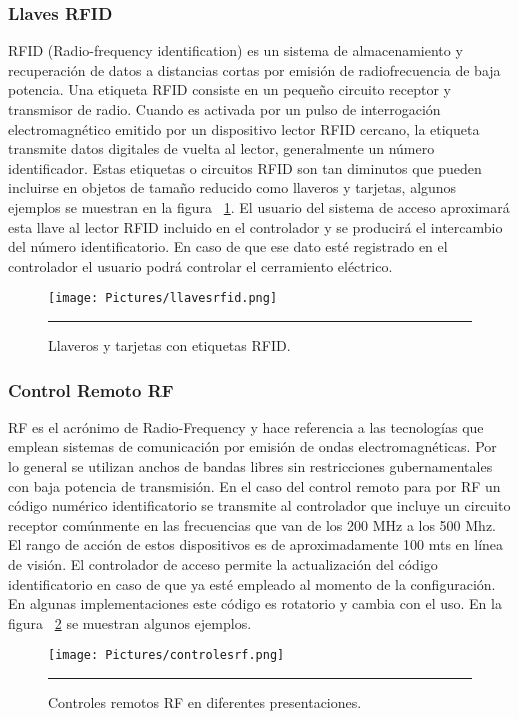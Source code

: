\subsubsection{Llaves RFID}
RFID (Radio-frequency identification) es un sistema de almacenamiento y recuperación de datos a distancias cortas por emisión de radiofrecuencia de baja potencia. 
Una etiqueta RFID consiste en un pequeño circuito receptor y transmisor de radio. Cuando es activada por un pulso de interrogación electromagnético emitido por un dispositivo lector RFID cercano, la etiqueta transmite datos digitales de vuelta al lector, generalmente un número identificador.
Estas etiquetas o circuitos RFID son tan diminutos que pueden incluirse en objetos de tamaño reducido como llaveros y tarjetas, algunos ejemplos se muestran en la figura ~\ref{fig:llavesrfid}.
El usuario del sistema de acceso aproximará esta llave al lector RFID incluido en el controlador y se producirá el intercambio del número identificatorio. En caso de que ese dato esté registrado en el controlador el usuario podrá controlar el cerramiento eléctrico.

\begin{figure}[htbp]
	\centering
	\texttt{[image: Pictures/llavesrfid.png]}
	\rule{35em}{1pt}
	\caption[Llaves RFID]{Llaveros y tarjetas con etiquetas RFID. }
	\label{fig:llavesrfid}
\end{figure}

\subsubsection{Control Remoto RF}
RF es el acrónimo de Radio-Frequency y hace referencia a las tecnologías que emplean sistemas de comunicación por emisión de ondas electromagnéticas. Por lo general se utilizan anchos de bandas libres sin restricciones gubernamentales con baja potencia de transmisión.
En el caso del control remoto para por RF un código numérico identificatorio se transmite al controlador que incluye un circuito receptor comúnmente en las frecuencias que van de los 200 MHz a los 500 Mhz. El rango de acción de estos dispositivos es de aproximadamente 100 mts en línea de visión.
El controlador de acceso permite la actualización del código identificatorio en caso de que ya esté empleado al momento de la configuración. En algunas implementaciones este código es rotatorio y cambia con el uso.
En la figura ~\ref{fig:controlesrf} se muestran algunos ejemplos.

\begin{figure}[htbp]
	\centering
	\texttt{[image: Pictures/controlesrf.png]}
	\rule{35em}{1pt}
	\caption[Controles RF]{Controles remotos RF en diferentes presentaciones. }
	\label{fig:controlesrf}
\end{figure}

